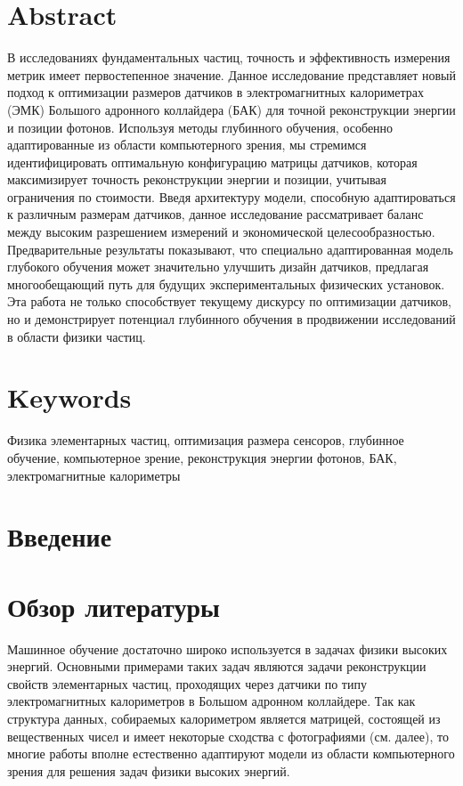 \documentclass[a4paper,12pt]{extarticle}
\begin{document}
\section*{Abstract}   %
В исследованиях фундаментальных частиц, точность и эффективность измерения метрик имеет первостепенное значение. Данное исследование представляет новый подход к оптимизации размеров датчиков в электромагнитных калориметрах (ЭМК) Большого адронного коллайдера (БАК) для точной реконструкции энергии и позиции фотонов. Используя методы глубинного обучения, особенно адаптированные из области компьютерного зрения, мы стремимся идентифицировать оптимальную конфигурацию матрицы датчиков, которая максимизирует точность реконструкции энергии и позиции, учитывая ограничения по стоимости. Введя архитектуру модели, способную адаптироваться к различным размерам датчиков, данное исследование рассматривает баланс между высоким разрешением измерений и экономической целесообразностью. Предварительные результаты показывают, что специально адаптированная модель глубокого обучения может значительно улучшить дизайн датчиков, предлагая многообещающий путь для будущих экспериментальных физических установок. Эта работа не только способствует текущему дискурсу по оптимизации датчиков, но и демонстрирует потенциал глубинного обучения в продвижении исследований в области физики частиц.


\section*{Keywords}
Физика элементарных частиц, оптимизация размера сенсоров, глубинное обучение, компьютерное зрение, реконструкция энергии фотонов, БАК, электромагнитные калориметры

\pagebreak

\section{Введение}



\section{Обзор литературы}

Машинное обучение достаточно широко используется в задачах физики высоких энергий. Основными примерами таких задач являются задачи реконструкции свойств элементарных частиц, проходящих через датчики по типу электромагнитных калориметров в Большом адронном коллайдере. Так как структура данных, собираемых калориметром является матрицей, состоящей из вещественных чисел и имеет некоторые сходства с фотографиями (см. далее), то многие работы вполне естественно адаптируют модели из области компьютерного зрения для решения задач физики высоких энергий.
\end{document}
